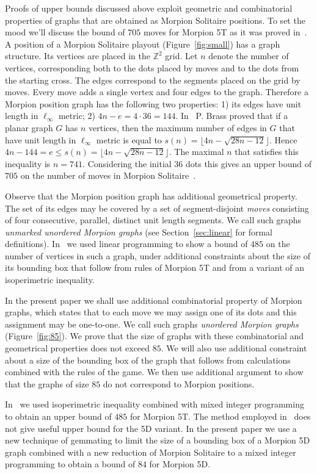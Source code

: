 Proofs of upper bounds discussed above exploit geometric and combinatorial properties of graphs that are obtained as Morpion Solitaire positions. 
To set the mood we'll discuss the bound of $705$ moves for Morpion 5T as it was proved in~\cite{demaine}.
A position of a Morpion Solitaire playout (Figure~\ref{fig:small}) has a graph structure.
Its vertices are placed in the $\mathbb{Z}^2$ grid.
Let $n$ denote the number of vertices, 
  corresponding both to the dots placed by moves and to the dots from the starting cross.
The edges correspond to the segments placed on the grid by moves.
Every move adds a single vertex and four edges to the graph.
Therefore a Morpion position graph has the following two properties: 1) its edges have unit length in $\ell_\infty$ metric; 2) $4n - e = 4 \cdot 36 = 144$.
In~\cite{brass} P. Brass proved that if a planar graph $G$ has $n$ vertices, 
  then the maximum number of edges in $G$ that have unit length in $\ell_\infty$ metric is equal to
  $
    s(n) = \lfloor 4n - \sqrt{28n - 12} \rfloor.
  $
Hence
$
  4n - 144 = e \leq s(n) = \lfloor 4n - \sqrt{28n - 12} \rfloor.
$
The maximal $n$ that satisfies this inequality is $n = 741$. 
Considering the initial $36$ dots this gives an upper bound of $705$ on the number of moves 
  in Morpion Solitaire~\cite{demaine}.
  
Observe that the Morpion position graph has additional geometrical property.
The set of its edges may be covered by a set of segment-disjoint \emph{moves} consisting of four consecutive, parallel, distinct unit length segments. 
We call such graphs \emph{unmarked unordered Morpion graphs} (see Section~\ref{sec:linear} for formal definitions).
In~\cite{} we used linear programming to show a bound of $485$ on the number of vertices
  in such a graph, under additional constraints about the size of its bounding box 
   that follow from rules of Morpion 5T and from a variant of an isoperimetric inequality.
  
In the present paper we shall use additional combinatorial property of Morpion graphs,
  which states that to each move we may assign one of its dots and this assignment may be one-to-one.
We call such graphs \emph{unordered Morpion graphs} (Figure~\ref{fig:85}).
We prove that the
  size of graphs with these combinatorial and geometrical properties does not exceed $85$.
We will also use additional constraint about a size of the bounding box of the graph that follows from
  calculations combined with the rules of the game.
We then use additional argument to show that the graphs of size $85$ do not correspond to Morpion positions.

In~\cite{} we used isoperimetric inequality combined with mixed integer programming to obtain an upper bound of $485$ for Morpion 5T. 
The method employed in~\cite{} does not give useful upper bound for the 5D variant.
In the present paper we use a new technique of gemmating to limit the size of a bounding box of a Morpion 5D graph combined with a new reduction of Morpion Solitaire to a mixed integer programming to obtain a bound of $84$ for Morpion 5D. 
